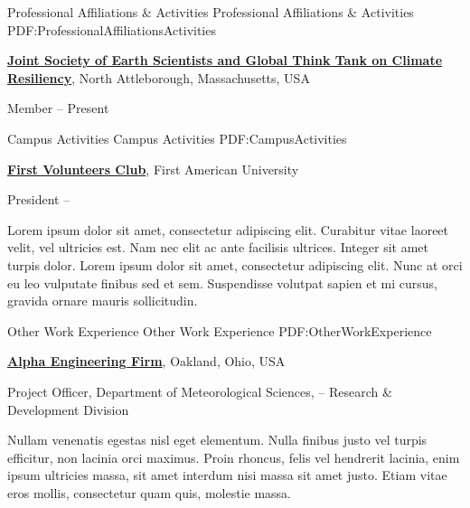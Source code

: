 \documentclass[letterpaper,MMMyyyy,nonstopmode]{simpleresumecv}
\begin{document}
\begin{Body}

\Section
{Professional Affiliations
\newline
\& Activities}
{Professional Affiliations \& Activities}
{PDF:ProfessionalAffiliationsActivities}

\Entry
\href{http://www.example.com/my-society}
{\textbf{Joint Society of Earth Scientists and Global Think Tank on Climate Resiliency}},
\newline
North Attleborough, Massachusetts, USA

\Gap
\BulletItem
Member
\hfill
{} --
Present

\newpage


\Section
{Campus Activities}
{Campus Activities}
{PDF:CampusActivities}

\Entry
\href{http://www.example.com/my-club}
{\textbf{First Volunteers Club}},
First American University

\Gap
\BulletItem
President
\hfill
{} --
\begin{Detail}
\SubBulletItem
Lorem ipsum dolor sit amet, consectetur adipiscing elit.
\SubBulletItem
Curabitur vitae laoreet velit, vel ultricies est. Nam nec elit ac ante facilisis ultrices.
\SubBulletItem
Integer sit amet turpis dolor. Lorem ipsum dolor sit amet, consectetur adipiscing elit. Nunc at orci eu leo vulputate finibus sed et sem.
\SubBulletItem
Suspendisse volutpat sapien et mi cursus, gravida ornare mauris sollicitudin.
\end{Detail}


\Section
{Other Work Experience}
{Other Work Experience}
{PDF:OtherWorkExperience}

\Entry
\href{http://www.example.com/my-company}
{\textbf{Alpha Engineering Firm}},
Oakland, Ohio, USA

\Gap
\BulletItem
Project Officer,
Department of Meteorological Sciences,
\hfill
{} --
\newline
Research \& Development Division
\begin{Detail}
\SubBulletItem
Nullam venenatis egestas nisl eget elementum.
\SubBulletItem
Nulla finibus justo vel turpis efficitur, non lacinia orci maximus. Proin rhoncus, felis vel hendrerit lacinia, enim ipsum ultricies massa, sit amet interdum nisi massa sit amet justo.
\SubBulletItem
Etiam vitae eros mollis, consectetur quam quis, molestie massa.
\end{Detail}


\end{Body}
\end{document}
